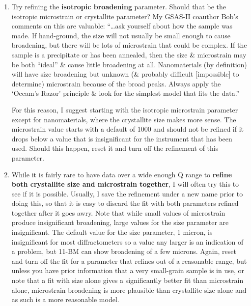 \begin{enumerate}
 \item Try refining the \textbf{isotropic broadening }parameter. Should that be the isotropic microstrain or crystallite parameter? My GSAS-II coauthor Bob’s comments on this are valuable: “…ask yourself about how the sample was made. If hand-ground, the size will not usually be small enough to cause broadening, but there will be lots of microstrain that could be complex. If the sample is a precipitate or has been annealed, then the size \& microstrain may be both “ideal” \& cause little broadening at all. Nanomaterials (by definition) will have size broadening but unknown (\& probably difficult [impossible] to determine) microstrain because of the broad peaks. Always apply the ‘Occam’s Razor’ principle \& look for the simplest model that fits the data.”

 For this reason, I suggest starting with the isotropic microstrain parameter except for nanomaterials, where the crystallite size makes more sense. The microstrain value starts with a default of 1000 and should not be refined if it drops below a value that is insignificant for the instrument that has been used. Should this happen, reset it and turn off the refinement of this parameter.

\item While it is fairly rare to have data over a wide enough Q range to \textbf{refine both crystallite size and microstrain together}, I will often try this to see if it is possible. Usually, I save the refinement under a new name prior to doing this, so that it is easy to discard the fit with both parameters refined together after it goes awry. Note that while small values of microstrain produce insignificant broadening, large values for the size parameter are insignificant. The default value for the size parameter, 1 micron, is insignificant for most diffractometers so a value any larger is an indication of a problem, but 11-BM can show broadening of a few microns. Again, reset and turn off the fit for a parameter that refines out of a reasonable range, but unless you have prior information that a very small-grain sample is in use, or note that a fit with size alone gives a significantly better fit than microstrain alone, microstrain broadening is more plausible than crystallite size alone and as such is a more reasonable model. 


\end{enumerate}
